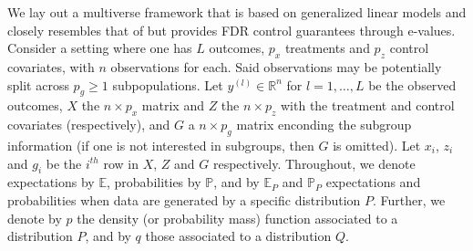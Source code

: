\documentclass[pdflatex,sn-mathphys-num]{sn-jnl}%
\theoremstyle{thmstyleone}%
\theoremstyle{thmstyletwo}%
\theoremstyle{thmstylethree}%
\begin{document}
We lay out a multiverse framework that is based on generalized linear models and closely resembles that of \cite{semken:2022} but provides FDR control guarantees through e-values.
Consider a setting where one has $L$ outcomes, $p_x$ treatments and $p_z$ control covariates, with $n$ observations for each.
Said observations may be potentially split across $p_g \geq 1$ subpopulations.
Let $y^{(l)} \in \mathbb{R}^n$ for $l=1,\ldots,L$ be the observed outcomes,
$X$ the $n \times p_x$ matrix and $Z$ the $n \times p_z$ with the treatment and control covariates (respectively),
and $G$ a $n \times p_g$ matrix enconding the subgroup information (if one is not interested in subgroups, then $G$ is omitted).
Let $x_i$, $z_i$ and $g_i$ be the $i^{th}$ row in $X$, $Z$ and $G$ respectively.
Throughout, we denote expectations by $\mathbb E$, probabilities by $\mathbb P$, and by $\mathbb E_P$ and $\mathbb P_P$ expectations and probabilities when data are generated by a specific distribution $P$.
Further, we denote by $p$ the density (or probability mass) function associated to a distribution $P$, and by $q$ those associated to a distribution $Q$.
\end{document}
